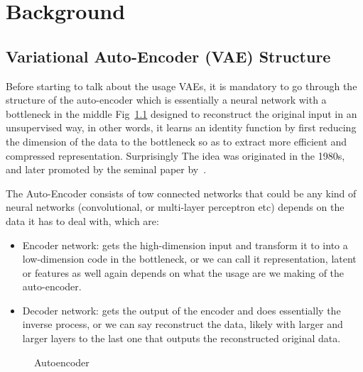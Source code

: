 

\pagestyle{fancy} 
\chapter{Background}
\label{cha:1}
\vspace{1cm}

\section{Variational Auto-Encoder (VAE) Structure}
Before starting to talk about the usage VAEs, it is mandatory to go through the structure of the auto-encoder which is essentially a neural network with a bottleneck in the middle Fig~\ref{fig:autoencoder} designed to reconstruct the original input in an unsupervised way, in other words, it learns an identity function by first reducing the dimension of the data to the bottleneck so as to extract more efficient and compressed representation. Surprisingly The idea was originated in the 1980s, and later promoted by the seminal paper by~\cite{hinton2006reducing}.

\vspace{0.3cm}
The Auto-Encoder consists of tow connected networks that could be any kind of neural networks (convolutional, or multi-layer perceptron etc) depends on the data it has to deal with, which are:
\begin{itemize}
	\item Encoder network: gets the high-dimension input and transform it to into a low-dimension code in the bottleneck, or we can call it representation, latent or features as well again depends on what the usage are we making of the auto-encoder.
	\item Decoder network: gets the output of the encoder and does essentially the inverse process, or we can say reconstruct the data, likely with larger and larger layers to the last one that outputs the reconstructed original data.
\end{itemize}

\begin{figure}
	\centerline
	\autoencoder
	\caption{Autoencoder}
	\label{fig:autoencoder}
\end{figure} 

